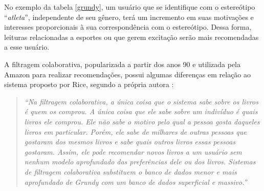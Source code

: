 No exemplo da tabela \ref{grundy}, um usuário que se identifique com o estereótipo
``\textit{atleta}'', independente de seu gênero, terá um incremento em suas
motivações e interesses proporcionais à sua correspondência com o estereótipo.
Dessa forma, leituras relacionadas a esportes ou que gerem excitação serão
mais recomendadas a esse usuário.

A filtragem colaborativa, popularizada a partir dos anos 90 e utilizada pela
Amazon \cite{amazon2017} para realizar recomendações,
possui algumas diferenças em relação ao sistema proposto por Rice, segundo a
própria autora \cite{rich:homepage}:

\begin{quotation}\small\noindent \textit{``Na filtragem colaborativa, a única
   coisa que o sistema sabe sobre os livros é quem os comprou. A única coisa que
   ele sabe sobre um indivíduo é quais livros ele comprou. Ele não sabe o motivo
   pelo qual a pessoa gosta daqueles livros em particular. Porém, ele sabe de
   milhares de outras pessoas que gostaram dos mesmos livros e sabe quais outros
   livros essas pessoas gostaram. Assim, ele pode recomendar novos livros a um
   usuário sem nenhum modelo aprofundado das preferências dele ou dos livros.
   Sistemas de filtragem colaborativa substituem o banco de dados menor e mais
   aprofundado de Grundy com um banco de dados superficial e massivo.''}
   \end{quotation}
